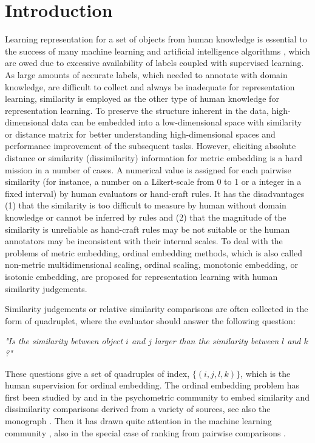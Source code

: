 \documentclass[letterpaper]{article}
\begin{document}
		\section{Introduction}
		Learning representation for a set of objects from human knowledge is essential to the success of many machine learning and artificial intelligence algorithms \cite{6472238}, which are owed due to excessive availability of labels coupled with supervised learning. As large amounts of accurate labels, which needed to annotate with domain knowledge, are difficult to collect and always be inadequate for representation learning, similarity is employed as the other type of human knowledge for representation learning. To preserve the structure inherent in the data, high-dimensional data can be embedded into a low-dimensional space \cite{Indyk:2001:AAL:874063.875596,Indyk04low-distortionembeddings} with similarity or distance matrix for better understanding high-dimensional spaces and performance improvement of the subsequent tasks. However, eliciting absolute distance or similarity (dissimilarity) information for metric embedding is a hard mission in a number of cases. A numerical value is assigned for each pairwise similarity (for instance, a number on a Likert-scale from 0 to 1 or a integer in a fixed interval) by human evaluators or hand-craft rules. It has the disadvantages (1) that the similarity is too difficult to measure by human without domain knowledge or cannot be inferred by rules and (2) that the magnitude of the similarity is unreliable as hand-craft rules may be not suitable or the human annotators may be inconsistent with their internal scales. To deal with the problems of metric embedding, ordinal embedding methods, which is also called non-metric multidimensional scaling, ordinal scaling, monotonic embedding, or isotonic embedding, are proposed for representation learning with human similarity judgements.

		Similarity judgements or relative similarity comparisons are often collected in the form of quadruplet, where the evaluator should answer the following question:

		\emph{"Is the similarity between object $i$ and $j$ larger than the similarity between $l$ and $k$?"}

		These questions give a set of quadruples of index, $\{(i,j,l,k)\}$, which is the human supervision for ordinal embedding. The ordinal embedding problem has first been studied by \cite{Shepard1962a,Shepard1962b} and \cite{Kruskal1964a,Kruskal1964b} in the psychometric community to embed similarity and dissimilarity comparisons derived from a variety of sources, see also the monograph \cite{Borg05}. Then it has drawn quite attention in the machine learning community \cite{agarwal2007generalized,jamieson2011low,McFee:2011:LMS:1953048.1953063,tamuz2011adaptiive,vandermaaten2012stochastic,Terada2014LocalOE,amid2015multiview,2016arXiv160607081J}, also in the special case of ranking from pairwise comparisons \cite{Mcfee10metriclearning,kevin2011active,wauthier2013efficient}.
\end{document}
